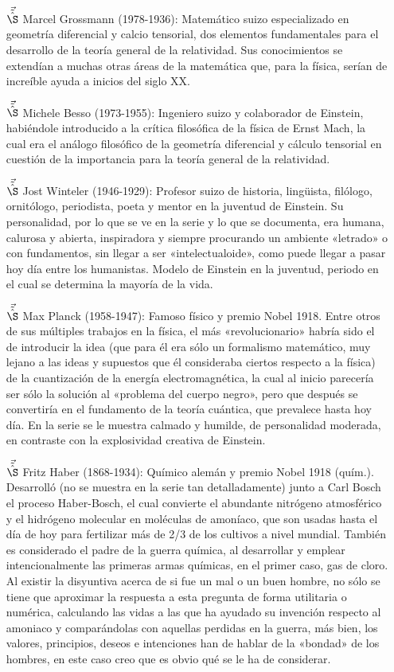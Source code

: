 \documentclass{article}
\begin{document}
\begin{itemize}
\item[$\vec{\tilde{\hat{\S}}}$] Marcel Grossmann (1978-1936): Matemático suizo especializado en geometría diferencial y calcio tensorial, dos elementos fundamentales para el desarrollo de la teoría general de la relatividad. Sus conocimientos se extendían a muchas otras áreas de la matemática que, para la física, serían de increíble ayuda a inicios del siglo XX.

\item[$\vec{\tilde{\hat{\S}}}$] Michele Besso (1973-1955): Ingeniero suizo y colaborador de Einstein, habiéndole introducido a la crítica filosófica de la física de Ernst Mach, la cual era el análogo filosófico de la geometría diferencial y cálculo tensorial en cuestión de la importancia para la teoría general de la relatividad.

\item[$\vec{\tilde{\hat{\S}}}$] Jost Winteler (1946-1929): Profesor suizo de historia, lingüista, filólogo, ornitólogo, periodista, poeta y mentor en la juventud de Einstein. Su personalidad, por lo que se ve en la serie y lo que se documenta, era humana, calurosa y abierta, inspiradora y siempre procurando un ambiente «letrado» o con fundamentos, sin llegar a ser «intelectualoide», como puede llegar a pasar hoy día entre los humanistas. Modelo de Einstein en la juventud, periodo en el cual se determina la mayoría de la vida.

\item[$\vec{\tilde{\hat{\S}}}$] Max Planck (1958-1947): Famoso físico y premio Nobel 1918. Entre otros de sus múltiples trabajos en la física, el más «revolucionario» habría sido el de introducir la idea (que para él era sólo un formalismo matemático, muy lejano a las ideas y supuestos que él consideraba ciertos respecto a la física) de la cuantización de la energía electromagnética, la cual al inicio parecería ser sólo la solución al «problema del cuerpo negro», pero que después se convertiría en el fundamento de la teoría cuántica, que prevalece hasta hoy día. En la serie se le muestra calmado y humilde, de personalidad moderada, en contraste con la explosividad creativa de Einstein.

\item[$\vec{\tilde{\hat{\S}}}$] Fritz Haber (1868-1934): Químico alemán y premio Nobel 1918 (quím.). Desarrolló (no se muestra en la serie tan detalladamente) junto a Carl Bosch el proceso Haber-Bosch, el cual convierte el abundante nitrógeno atmosférico y el hidrógeno molecular en moléculas de amoníaco, que son usadas hasta el día de hoy para fertilizar más de 2/3 de los cultivos a nivel mundial. También es considerado el padre de la guerra química, al desarrollar y emplear intencionalmente las primeras armas químicas, en el primer caso, gas de cloro. Al existir la disyuntiva acerca de si fue un mal o un buen hombre, no sólo se tiene que aproximar la respuesta a esta pregunta de forma utilitaria o numérica, calculando las vidas a las que ha ayudado su invención respecto al amoniaco y comparándolas con aquellas perdidas en la guerra, más bien, los valores, principios, deseos e intenciones han de hablar de la «bondad» de los hombres, en este caso creo que es obvio qué se le ha de considerar.


\end{itemize}
\end{document}
